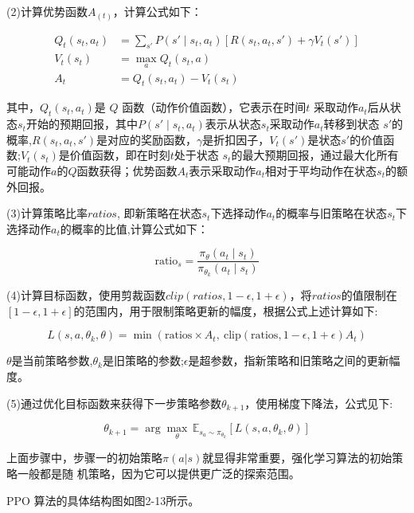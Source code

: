 (2)计算优势函数$𝐴_(t)$，计算公式如下：

\begin{align}
	Q_t(s_t, a_t) &= \sum_{s'} P(s' \mid s_t, a_t) \left[ R(s_t, a_t, s') + \gamma V_t(s') \right] \\
	V_t(s_t) &= \max_a Q_t(s_t, a) \\
	A_t &= Q_t(s_t, a_t) - V_t(s_t)
\end{align}

其中，$Q_t(s_t, a_t)$是 $Q$ 函数（动作价值函数），它表示在时间$t$ 采取动作$a_t$后从状态$s_t$开始的预期回报，其中$P(s' \mid s_t, a_t)$表示从状态$s_t$采取动作$a_t$转移到状态 $s'$的概率,$R(s_t, a_t, s')$是对应的奖励函数，$\gamma$是折扣因子，$V_t(s')$是状态$s'$的价值函数;$V_t(s_t)$是价值函数，即在时刻$t$处于状态 $s_t$的最大预期回报，通过最大化所有可能动作$a$的$Q$函数获得；优势函数$A_t$表示采取动作$a_t$相对于平均动作在状态$s_t$的额外回报。

(3)计算策略比率$ratios$, 即新策略在状态$s_t$下选择动作$a_t$的概率与旧策略在状态$s_t$下选择动作$a_t$的概率的比值,计算公式如下：

\begin{equation}
	\text{ratio}_s = \frac{\pi_\theta(a_t \mid s_t)}{\pi_{\theta_k}(a_t \mid s_t)}
\end{equation}

(4)计算目标函数，使用剪裁函数$𝑐𝑙𝑖𝑝(𝑟𝑎𝑡𝑖𝑜𝑠, 1 − 𝜖, 1 + 𝜖)$，将$ratios$的值限制在$[1 − 𝜖, 1 + 𝜖]$的范围内，用于限制策略更新的幅度，根据公式上述计算如下:

\begin{equation}
	L(s, a, \theta_k, \theta) = \min\left( \text{ratios} \times A_t, \ \text{clip}\left( \text{ratios}, 1 - \epsilon, 1 + \epsilon \right) A_t \right)
\end{equation}

$𝜃$是当前策略参数,$𝜃_𝑘$是旧策略的参数;$𝜖$是超参数，指新策略和旧策略之间的更新幅度。

(5)通过优化目标函数来获得下一步策略参数\(𝜃_{𝑘+1}\)，使用梯度下降法，公式见下:

\begin{equation}
	\theta_{k+1} = \arg\max_{\theta} \, \mathbb{E}_{s_a \sim \pi_{\theta_k}} \left[ L(s, a, \theta_k, \theta) \right]
\end{equation}

上面步骤中，步骤一的初始策略$𝜋(𝑎|𝑠)$就显得非常重要，强化学习算法的初始策略一般都是随
机策略，因为它可以提供更广泛的探索范围。

PPO 算法的具体结构图\cite{YYKX202405015}如图2-13所示。

